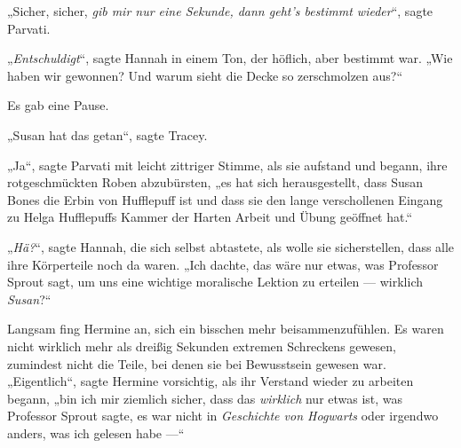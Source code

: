„Sicher, sicher, \emph{gib mir nur eine Sekunde, dann geht’s bestimmt wieder}“, sagte Parvati.

„\emph{Entschuldigt}“, sagte Hannah in einem Ton, der höflich, aber bestimmt war.
„Wie haben wir gewonnen? Und warum sieht die Decke so zerschmolzen aus?“

Es gab eine Pause.

„Susan hat das getan“, sagte Tracey.

„Ja“, sagte Parvati mit leicht zittriger Stimme, als sie aufstand und begann, ihre rotgeschmückten Roben abzubürsten, „es hat sich herausgestellt, dass Susan Bones die Erbin von Hufflepuff ist und dass sie den lange verschollenen Eingang zu Helga Hufflepuffs Kammer der Harten Arbeit und Übung geöffnet hat.“

„\emph{Hä?}“, sagte Hannah, die sich selbst abtastete, als wolle sie sicherstellen, dass alle ihre Körperteile noch da waren.
„Ich dachte, das wäre nur etwas, was Professor Sprout sagt, um uns eine wichtige moralische Lektion zu erteilen — wirklich \emph{Susan}?“

Langsam fing Hermine an, sich ein bisschen mehr beisammenzufühlen. Es waren nicht wirklich mehr als dreißig Sekunden extremen Schreckens gewesen, zumindest nicht die Teile, bei denen sie bei Bewusstsein gewesen war.
„Eigentlich“, sagte Hermine vorsichtig, als ihr Verstand wieder zu arbeiten begann, „bin ich mir ziemlich sicher, dass das \emph{wirklich} nur etwas ist, was Professor Sprout sagte, es war nicht in \emph{Geschichte von Hogwarts} oder irgendwo anders, was ich gelesen habe —“

